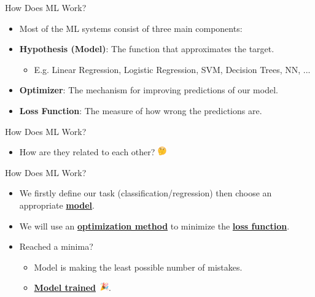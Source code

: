 \begin{frame}{How Does ML Work?}
    \begin{itemize}
        \item Most of the ML systems consist of three main components:
    \end{itemize}

    \begin{itemize}
        \item \textbf{Hypothesis (Model)}: The function that approximates the target.
        \begin{itemize}
            \item E.g. Linear Regression, Logistic Regression, SVM, Decision Trees, NN, ...
        \end{itemize}

        \item \textbf{Optimizer}: The mechanism for improving predictions of our model.

        \item \textbf{Loss Function}: The measure of how wrong the predictions are.
    \end{itemize}
\end{frame}


\begin{frame}{How Does ML Work?}
    \begin{itemize}
        \item How are they related to each other? \includegraphics[height=1em]{images/emojis/thinking-face.png}
    \end{itemize}
\end{frame}

\begin{frame}{How Does ML Work?}
    \begin{itemize}
        \item We firstly define our task (classification/regression) then choose an appropriate \underline{\textbf{model}}.
        \item We will use an \underline{\textbf{optimization method}} to minimize the \underline{\textbf{loss function}}.
        \item Reached a minima?
        \begin{itemize}
            \item Model is making the least possible number of mistakes.
            \item \underline{\textbf{Model trained}}~\includegraphics[height=1em]{images/emojis/party-popper.png}.
        \end{itemize}
    \end{itemize}
\end{frame}


